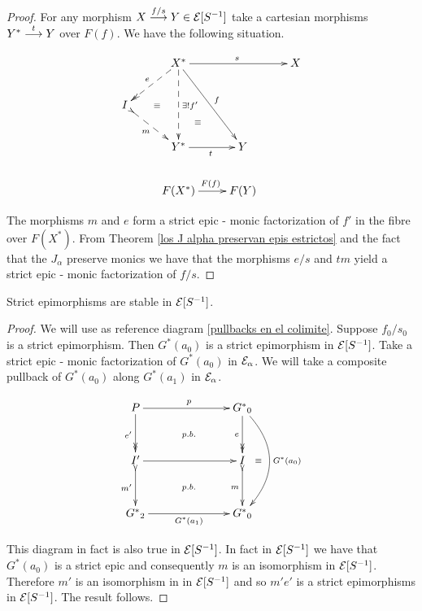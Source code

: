 \begin{proof}
For any morphism ${X \overset {f/s} {\longrightarrow} Y \in \mathcal{E}[S^{-1}]}$ take a cartesian morphisms ${Y^* \overset {t} {\longrightarrow} Y}$ over $F(f)$. We have the following situation.

\begin{align*}
\newdir{(>}{{}*!/-6pt/\dir{>}}
\xymatrix{ & X^* \ar[rr]^s \ar@{-->>}[dl]_e \ar@{-->}[dd]^{\exists ! f'} \ar[ddr]^f && X   \\
		  I \ar@{}[r]|(.6)\equiv \ar@{(>-->}[dr]_m  && \\
		   & Y^* \ar[r]_t \ar@{}[uur]|(.30)\equiv & Y \\
		   & F(X^*) \ar[r]^{F(f)} & F(Y)}
\end{align*}

\noindent The morphisms $m$ and $e$ form a strict epic - monic factorization of $f'$ in the fibre over $F(X^*)$. From Theorem \ref{los J alpha preservan epis estrictos} and the fact that the $J_\alpha$ preserve monics we have that the morphisms $e/s$ and $tm$ yield a strict epic - monic factorization of $f/s$.

\end{proof}


\begin{proposition}
Strict epimorphisms are stable in $\mathcal{E}[S^{-1}]$.
\end{proposition}

\begin{proof}
We will use as reference diagram \ref{pullbacks en el colimite}. Suppose $f_0/{s_0}$ is a strict epimorphism. Then $G^*(a_0)$ is a strict epimorphism in $\mathcal{E}[S^{-1}]$. Take a strict epic - monic factorization of $G^*(a_0)$ in $\mathcal{E}_\alpha$. We will take a composite pullback of $G^*(a_0)$ along $G^*(a_1)$ in $\mathcal{E}_\alpha$.


\begin{align*}
\newdir{(>}{{}*!/-6pt/\dir{>}}
\xymatrix @+2ex {P  \ar[rr]^p \ar@{->>}[d]_{e'} &{} \ar@{}[d]|{p.b.}  & {G^*}_0 \ar@{->>}[d]_e \ar@/^2pc/[dd]^{G^*(a_0)} \\
		  I'\ar[rr] \ar@{(>->}[d]_{m'} & {} \ar@{}[d]|{p.b.} & I \ar@{}[r]|(.3)\equiv \ar@{(>->}[d]_{m} & \\
		  {G^*}_2 \ar[rr]_{G^*(a_1)} && {G^*}_0}
\end{align*}

\noindent This diagram in fact is also true in $\mathcal{E}[S^{-1}]$. In fact  in $\mathcal{E}[S^{-1}]$  we have that $G^*(a_0)$ is a strict epic and consequently $m$ is an isomorphism in $\mathcal{E}[S^{-1}]$. Therefore $m'$ is an isomorphism in in $\mathcal{E}[S^{-1}]$ and so $m'e'$ is a strict epimorphisms in $\mathcal{E}[S^{-1}]$. The result follows.
\end{proof}

